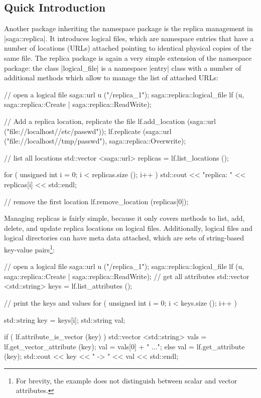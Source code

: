 

 \subsection{Quick Introduction}

  Another package inheriting the namespace package is the replica
  management in |saga::replica|.  It introduces logical files,  which
  are namespace entries that have a number of locations (URLs)
  attached pointing to identical physical copies of the same file.
  The replica package is again a very simple extension of the namespace
  package: the class |logical_file| is a namespace |entry| class with
  a number of additional methods which allow to manage the list of
  attached URLs:

  \begin{mycode}[label=Managing replica locations]
  // open a logical file
  saga::url u ("/replica_1");
  saga::replica::logical_file lf (u, saga::replica::Create
                                  |  saga::replica::ReadWrite);

  // Add a replica location, replicate the file
  lf.add_location    (saga::url ("file://localhost//etc/passwd"));
  lf.replicate       (saga::url ("file://localhost//tmp/passwd"),
                      saga::replica::Overwrite);

  // list all locations 
  std::vector <saga::url> replicas = lf.list_locations ();

  for ( unsigned int i = 0; i < replicas.size (); i++ )
  {
    std::cout << "replica: " << replicas[i] << std::endl;
  }

  // remove the first location
  lf.remove_location (replicas[0]);
  \end{mycode}

  Managing replicas is fairly simple, because it only covers methods to
  list, add, delete, and update replica locations on logical files.
  Additionally, logical files and logical directories can have meta
  data attached, which are sets of string-based key-value
  pairs\footnote{For brevity, the example does not distinguish between scalar and
  vector attributes.}:

  \begin{mycode}[label=Managing replica meta data]
  // open a logical file
  saga::url u ("/replica_1");
  saga::replica::logical_file lf (u, saga::replica::Create
                                  |  saga::replica::ReadWrite);
  // get all attributes
  std::vector <std::string> keys = lf.list_attributes ();

  // print the keys and values
  for ( unsigned int i = 0; i < keys.size (); i++ )
  {
    std::string key = keys[i];
    std::string val;

    if ( lf.attribute_is_vector (key) )
    {
      std::vector <std::string> vals = lf.get_vector_attribute (key);
      val = vals[0] + " ...";
    }
    else
    {
      val = lf.get_attribute (key);
    }
    std::cout << key << " -> " << val << std::endl;
  }
  \end{mycode}

